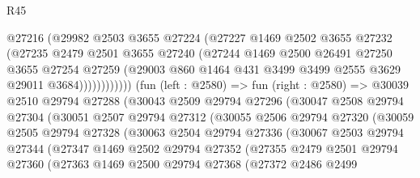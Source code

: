 \begin{lexlean}{R45}
\begin{coremodule}
                      @27216
                      (@29982
                        @2503
                        @3655
                        @27224
                        (@27227
                          @1469
                          @2502
                          @3655
                          @27232
                          (@27235
                            @2479
                            @2501
                            @3655
                            @27240
                            (@27244
                              @1469
                              @2500
                              @26491
                              @27250
                              @3655
                              @27254
                              @27259
                              (@29003
                                @860
                                @1464
                                @431
                                @3499
                                @3499
                                @2555
                                @3629
                                @29011
                                @3684))))))))))))
        (fun (left : @2580) =>
        fun (right : @2580) =>
        @30039
          @2510
          @29794
          @27288
          (@30043
            @2509
            @29794
            @27296
            (@30047
              @2508
              @29794
              @27304
              (@30051
                @2507
                @29794
                @27312
                (@30055
                  @2506
                  @29794
                  @27320
                  (@30059
                    @2505
                    @29794
                    @27328
                    (@30063
                      @2504
                      @29794
                      @27336
                      (@30067
                        @2503
                        @29794
                        @27344
                        (@27347
                          @1469
                          @2502
                          @29794
                          @27352
                          (@27355
                            @2479
                            @2501
                            @29794
                            @27360
                            (@27363
                              @1469
                              @2500
                              @29794
                              @27368
                              (@27372
                                @2486
                                @2499

\end{coremodule}
\end{lexlean}
